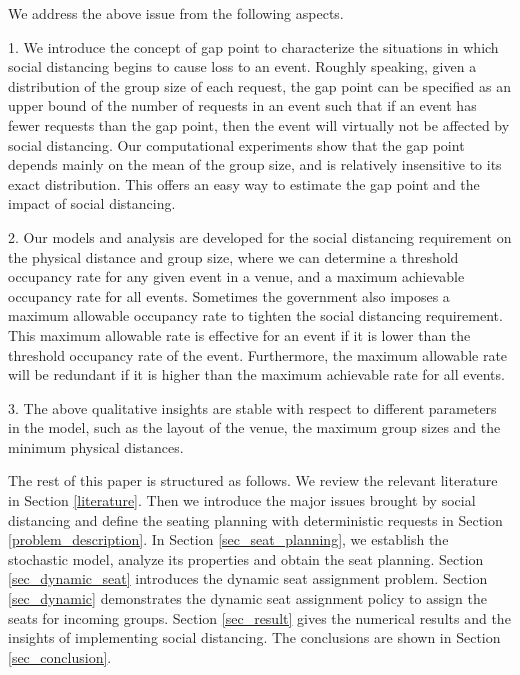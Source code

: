 We address the above issue from the following aspects.

1. We introduce the concept of gap point to characterize the situations in which social distancing begins to cause loss to an event. Roughly speaking, given a distribution of the group size of each request, the gap point can be specified as an upper bound of the number of requests in an event such that if an event has fewer requests than the gap point, then the event will virtually not be affected by social distancing. Our computational experiments show that the gap point depends mainly on the mean of the group size, and is relatively insensitive to its exact distribution. This offers an easy way to estimate the gap point and the impact of social distancing.


2. Our models and analysis are developed for the social distancing requirement on the physical distance and group size, where we can determine a threshold occupancy rate for any given event in a venue, and a maximum achievable occupancy rate for all events. Sometimes the government also imposes a maximum allowable occupancy rate to tighten the social distancing requirement. This maximum allowable rate is effective for an event if it is lower than the threshold occupancy rate of the event. Furthermore, the maximum allowable rate will be redundant if it is higher than the maximum achievable rate for all events.

3. The above qualitative insights are stable with respect to different parameters in the model, such as the layout of the venue, the maximum group sizes and the minimum physical distances. 

The rest of this paper is structured as follows. We review the relevant literature in Section \ref{literature}. Then we introduce the major issues brought by social distancing and define the seating planning with deterministic requests in Section \ref{problem_description}. In Section \ref{sec_seat_planning}, we establish the stochastic model, analyze its properties and obtain the seat planning. Section \ref{sec_dynamic_seat} introduces the dynamic seat assignment problem. Section \ref{sec_dynamic} demonstrates the dynamic seat assignment policy to assign the seats for incoming groups. Section \ref{sec_result} gives the numerical results and the insights of implementing social distancing. The conclusions are shown in Section \ref{sec_conclusion}.
\newpage
